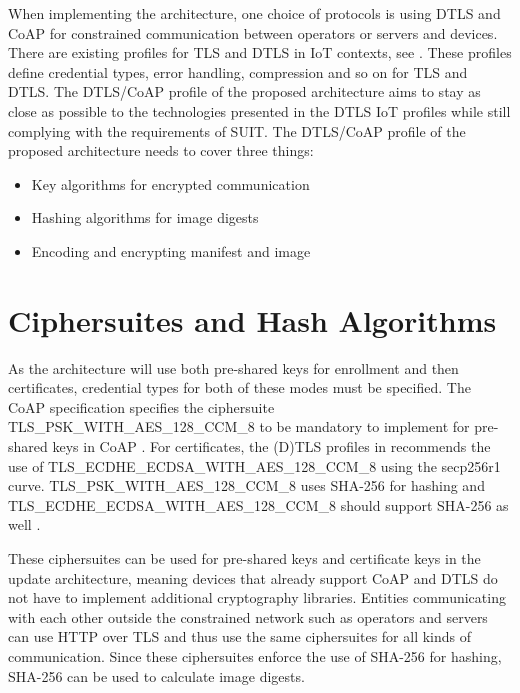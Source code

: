 \documentclass[0-thesis.tex]{subfiles}
\begin{document}
\label{chap:profiles}
When implementing the architecture, one choice of protocols is using DTLS and CoAP for
constrained communication between operators or servers and devices. There are existing
profiles for TLS and DTLS in IoT contexts, see \parencite{rfc7925}. These profiles define
credential types, error handling, compression and so on for TLS and DTLS. The DTLS/CoAP
profile of the proposed architecture aims to stay as close as possible to the technologies
presented in the DTLS IoT profiles while still complying with the requirements of SUIT.
The DTLS/CoAP profile of the proposed architecture needs to cover three things:

\begin{itemize}
    \item Key algorithms for encrypted communication
    \item Hashing algorithms for image digests
    \item Encoding and encrypting manifest and image
\end{itemize}


\section{Ciphersuites and Hash Algorithms}
\label{sec:ciphersuites-hash}
As the architecture will use both pre-shared keys for enrollment and then certificates,
credential types for both of these modes must be specified. The CoAP specification
specifies the ciphersuite TLS\_PSK\_WITH\_AES\_128\_CCM\_8{} to be mandatory to implement
for pre-shared keys in CoAP \parencite{rfc7252}. For certificates, the (D)TLS profiles in
\parencite{rfc7925} recommends the use of TLS\_ECDHE\_ECDSA\_WITH\_AES\_128\_CCM\_8{}
using the secp256r1 curve. TLS\_PSK\_WITH\_AES\_128\_CCM\_8{} uses SHA-256 for hashing and
TLS\_ECDHE\_ECDSA\_WITH\_AES\_128\_CCM\_8{} should support SHA-256 as well
\parencite{rfc7251}. 

These ciphersuites can be used for pre-shared keys and certificate keys in the update
architecture, meaning devices that already support CoAP and DTLS do not have to implement
additional cryptography libraries. Entities communicating with each other outside the
constrained network such as operators and servers can use HTTP over TLS and thus use the
same ciphersuites for all kinds of communication. Since these ciphersuites enforce the use
of SHA-256 for hashing, SHA-256 can be used to calculate image digests.
\end{document}
